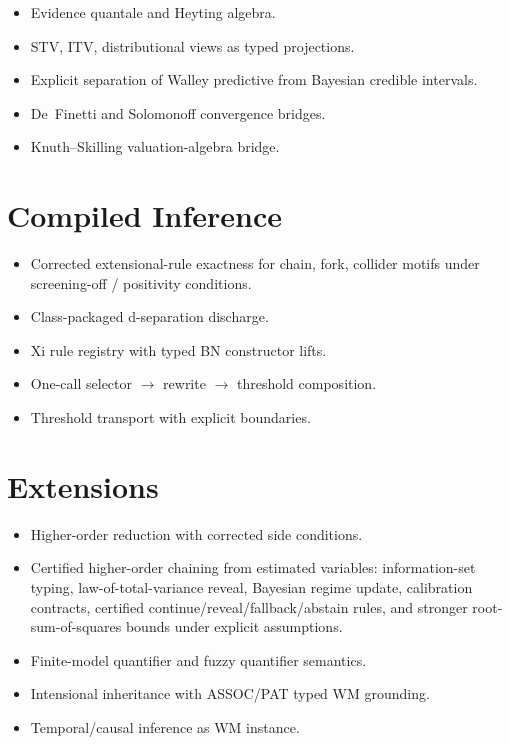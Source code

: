 \documentclass[11pt,openany]{report}
\begin{document}
\begin{itemize}
\item Evidence quantale and Heyting algebra.
\item STV, ITV, distributional views as typed projections.
\item Explicit separation of Walley predictive from Bayesian credible
  intervals.
\item De~Finetti and Solomonoff convergence bridges.
\item Knuth--Skilling valuation-algebra bridge.
\end{itemize}

\section{Compiled Inference}

\begin{itemize}
\item Corrected extensional-rule exactness for chain, fork, collider motifs
  under screening-off / positivity conditions.
\item Class-packaged d-separation discharge.
\item Xi rule registry with typed BN constructor lifts.
\item One-call selector $\to$ rewrite $\to$ threshold composition.
\item Threshold transport with explicit boundaries.
\end{itemize}

\section{Extensions}

\begin{itemize}
\item Higher-order reduction with corrected side conditions.
\item Certified higher-order chaining from estimated variables:
  information-set typing, law-of-total-variance reveal, Bayesian
  regime update, calibration contracts, certified
  continue/reveal/fallback/abstain rules, and stronger
  root-sum-of-squares bounds under explicit assumptions.
\item Finite-model quantifier and fuzzy quantifier semantics.
\item Intensional inheritance with ASSOC/PAT typed WM grounding.
\item Temporal/causal inference as WM instance.
\end{itemize}
\end{document}
